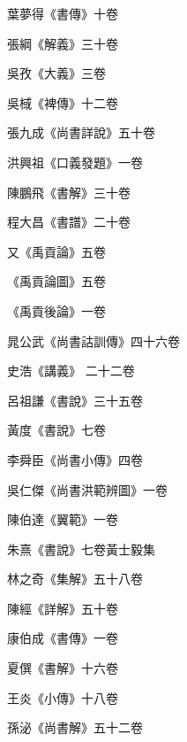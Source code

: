 \begin{pinyinscope}
 葉夢得《書傳》十卷



 張綱《解義》三十卷



 吳孜《大義》三卷



 吳棫《裨傳》十二卷



 張九成《尚書詳說》五十卷



 洪興祖《口義發題》一卷



 陳鵬飛《書解》三十卷



 程大昌《書譜》二十卷



 又《禹貢論》五卷



 《禹貢論圖》五卷



 《禹貢後論》一卷



 晁公武《尚書詁訓傳》四十六卷



 史浩《講義》
 二十二卷



 呂祖謙《書說》三十五卷



 黃度《書說》七卷



 李舜臣《尚書小傳》四卷



 吳仁傑《尚書洪範辨圖》一卷



 陳伯達《翼範》一卷



 朱熹《書說》七卷黃士毅集



 林之奇《集解》五十八卷



 陳經《詳解》五十卷



 康伯成《書傳》一卷



 夏僎《書解》十六卷



 王炎《小傳》十八卷



 孫泌《尚書解》五十二卷




\end{pinyinscope}
